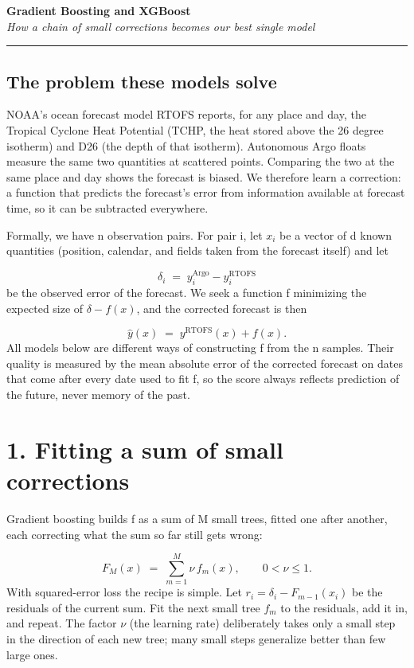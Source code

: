 \documentclass[11pt]{article}
\begin{document}
{\huge\bfseries Gradient Boosting and XGBoost}\\[2.5mm]
{\large\itshape How a chain of small corrections becomes our best single model}\\[2mm]
\hrule\vspace{5mm}

\subsection*{The problem these models solve}
NOAA's ocean forecast model RTOFS reports, for any place and day, the Tropical Cyclone Heat Potential (TCHP, the heat stored above the 26 degree isotherm) and D26 (the depth of that isotherm). Autonomous Argo floats measure the same two quantities at scattered points. Comparing the two at the same place and day shows the forecast is biased. We therefore learn a correction: a function that predicts the forecast's error from information available at forecast time, so it can be subtracted everywhere.

Formally, we have n observation pairs. For pair i, let $x_i$ be a vector of d known quantities (position, calendar, and fields taken from the forecast itself) and let

\[ \delta_i \;=\; y_i^{\mathrm{Argo}} - y_i^{\mathrm{RTOFS}} \]
be the observed error of the forecast. We seek a function f minimizing the expected size of $\delta-f(x)$, and the corrected forecast is then

\[ \hat{y}(x) \;=\; y^{\mathrm{RTOFS}}(x) + f(x). \]
All models below are different ways of constructing f from the n samples. Their quality is measured by the mean absolute error of the corrected forecast on dates that come after every date used to fit f, so the score always reflects prediction of the future, never memory of the past.

\section*{1. Fitting a sum of small corrections}
Gradient boosting builds f as a sum of M small trees, fitted one after another, each correcting what the sum so far still gets wrong:

\[ F_M(x) \;=\; \sum_{m=1}^{M} \nu\, f_m(x), \qquad 0<\nu\le 1 . \]
With squared-error loss the recipe is simple. Let $r_i = \delta_i - F_{m-1}(x_i)$ be the residuals of the current sum. Fit the next small tree $f_m$ to the residuals, add it in, and repeat. The factor $\nu$ (the learning rate) deliberately takes only a small step in the direction of each new tree; many small steps generalize better than few large ones.
\end{document}
